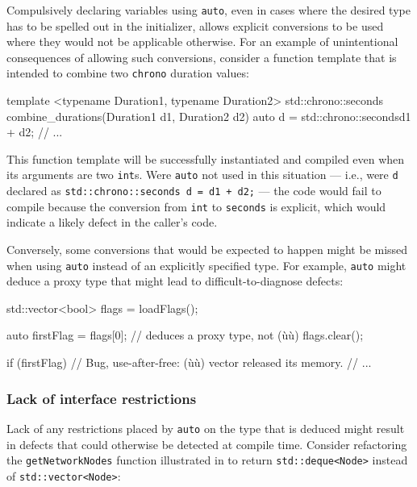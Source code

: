 Compulsively declaring variables using \lstinline!auto!, even in cases
where the desired type has to be spelled out in the initializer, allows
explicit conversions to be used where they would not be applicable
otherwise. For an example of unintentional consequences of allowing such
conversions, consider a function template that is intended to combine
two \lstinline!chrono! duration values:

\begin{emcppslisting}[language=C++]
template <typename Duration1, typename Duration2>
std::chrono::seconds combine_durations(Duration1 d1, Duration2 d2)
{
    auto d = std::chrono::seconds{d1 + d2};
    // ...
}
\end{emcppslisting}
    
\noindent This function template will be successfully instantiated and compiled
even when its arguments are two \lstinline!int!s. Were \lstinline!auto! not
used in this situation --- i.e., were \lstinline!d! declared as
\lstinline!std::chrono::seconds!~\lstinline!d!~\lstinline!=!~\lstinline!d1!~\lstinline!+!~\lstinline!d2;!
--- the code would fail to compile because the conversion from
\lstinline!int! to \lstinline!seconds! is explicit, which would indicate a
likely defect in the caller's code.

Conversely, some conversions that would be expected to happen might be
missed when using \lstinline!auto! instead of an explicitly specified type.
For example, \lstinline!auto! might deduce a proxy type that might lead to
difficult-to-diagnose defects:

\begin{emcppslisting}[language=C++]
std::vector<bool> flags = loadFlags();

auto firstFlag = flags[0];  // deduces a proxy type, not (ù{}ù)
flags.clear();

if (firstFlag) // Bug, use-after-free: (ù{}ù) vector released its memory.
{
    // ...
}
\end{emcppslisting}
    

\subsubsection[Lack of interface restrictions]{Lack of interface restrictions}\label{lack-of-interface-restrictions}

Lack of any restrictions placed by \lstinline!auto! on the type that is
deduced might result in defects that could otherwise be detected at
compile time. Consider refactoring the \lstinline!getNetworkNodes! function
illustrated in  to return \lstinline!std::deque<Node>! instead of
\lstinline!std::vector<Node>!:

